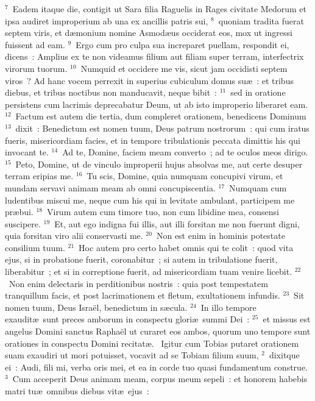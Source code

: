 ${}^{7}$~Eadem itaque die, contigit ut Sara filia Raguelis in Rages civitate Medorum et ipsa audiret improperium ab una ex ancillis patris sui,
${}^{8}$~quoniam tradita fuerat septem viris, et d\ae monium nomine Asmod\ae us occiderat eos, mox ut ingressi fuissent ad eam.
${}^{9}$~Ergo cum pro culpa sua increparet puellam, respondit ei, dicens~: Amplius ex te non videamus filium aut filiam super terram, interfectrix virorum tuorum.
${}^{10}$~Numquid et occidere me vis, sicut jam occidisti septem viros~? Ad hanc vocem perrexit in superius cubiculum domus su\ae~: et tribus diebus, et tribus noctibus non manducavit, neque bibit~:
${}^{11}$~sed in oratione persistens cum lacrimis deprecabatur Deum, ut ab isto improperio liberaret eam.
${}^{12}$~Factum est autem die tertia, dum compleret orationem, benedicens Dominum
${}^{13}$~dixit~: Benedictum est nomen tuum, Deus patrum nostrorum~: qui cum iratus fueris, misericordiam facies, et in tempore tribulationis peccata dimittis his qui invocant te.
${}^{14}$~Ad te, Domine, faciem meam converto~; ad te oculos meos dirigo.
${}^{15}$~Peto, Domine, ut de vinculo improperii hujus absolvas me, aut certe desuper terram eripias me.
${}^{16}$~Tu scis, Domine, quia numquam concupivi virum, et mundam servavi animam meam ab omni concupiscentia.
${}^{17}$~Numquam cum ludentibus miscui me, neque cum his qui in levitate ambulant, participem me pr\ae bui.
${}^{18}$~Virum autem cum timore tuo, non cum libidine mea, consensi suscipere.
${}^{19}$~Et, aut ego indigna fui illis, aut illi forsitan me non fuerunt digni, quia forsitan viro alii conservasti me.
${}^{20}$~Non est enim in hominis potestate consilium tuum.
${}^{21}$~Hoc autem pro certo habet omnis qui te colit~: quod vita ejus, si in probatione fuerit, coronabitur~; si autem in tribulatione fuerit, liberabitur~; et si in correptione fuerit, ad misericordiam tuam venire licebit.
${}^{22}$~Non enim delectaris in perditionibus nostris~: quia post tempestatem tranquillum facis, et post lacrimationem et fletum, exultationem infundis.
${}^{23}$~Sit nomen tuum, Deus Isra\"el, benedictum in s\ae cula.
${}^{24}$~In illo tempore exaudit\ae\ sunt preces amborum in conspectu glori\ae\ summi Dei~:
${}^{25}$~et missus est angelus Domini sanctus Rapha\"el ut curaret eos ambos, quorum uno tempore sunt orationes in conspectu Domini recitat\ae .
~Igitur cum Tobias putaret orationem suam exaudiri ut mori potuisset, vocavit ad se Tobiam filium suum,
${}^{2}$~dixitque ei~: Audi, fili mi, verba oris mei, et ea in corde tuo quasi fundamentum construe.
${}^{3}$~Cum acceperit Deus animam meam, corpus meum sepeli~: et honorem habebis matri tu\ae\ omnibus diebus vit\ae\ ejus~:
